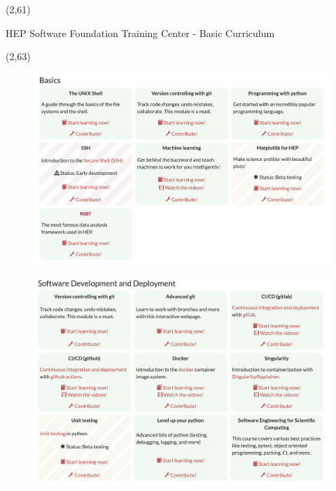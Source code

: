 \documentclass[final]{beamer}
\begin{document}
\begin{frame}{}

\begin{textblock}{38.0}(2,61)
\begin{block}{HEP Software Foundation Training Center - Basic Curriculum}
\begin{textblock}{19.0}(2,63)
\begin{figure}[tbph]
\centering
\includegraphics[width=1.00\textwidth]{images/hsf-training-1.png}
\end{figure}
\begin{figure}[tbph]
\centering
\includegraphics[width=1.00\textwidth]{images/hsf-training-2.png}
\end{figure}
\begin{figure}[tbph]
\centering

\end{figure}
\end{textblock}
\end{block}
\end{textblock}
\end{frame}
\end{document}
